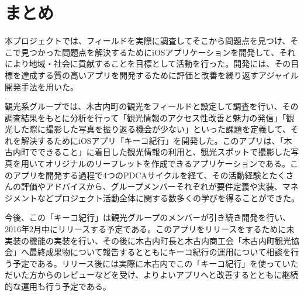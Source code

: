 \section{まとめ}
本プロジェクトでは、フィールドを実際に調査してそこから問題点を見つけ、そこで見つかった問題点を解決するためにiOSアプリケーションを開発して、それにより地域・社会に貢献することを目標として活動を行った。開発には、その目標を達成する質の高いアプリを開発するために評価と改善を繰り返すアジャイル開発手法を用いた。\\
\par 観光系グループでは、木古内町の観光をフィールドと設定して調査を行い、その調査結果をもとに分析を行って「観光情報のアクセス性改善と魅力の発信」「観光した際に撮影した写真を振り返る機会が少ない」といった課題を定義して、それを解決するためにiOSアプリ「キーコ紀行」を開発した。このアプリは、「木古内町でできること」に着目した観光情報の利用と、観光スポットで撮影した写真を用いてオリジナルのリーフレットを作成できるアプリケーションである。このアプリを開発する過程で4つのPDCAサイクルを経て、その活動経験とたくさんの評価やアドバイスから、グループメンバーそれぞれが要件定義や実装、マネジメントなどプロジェクト活動全体に関する数多くの学びを得ることができた。\\
\par 今後、この「キーコ紀行」は観光グループのメンバーが引き続き開発を行い、2016年2月中にリリースする予定である。このアプリをリリースをするために未実装の機能の実装を行い、その後に木古内町長と木古内商工会「木古内町観光協会」へ最終成果物について報告するとともにキーコ紀行の運用について相談を行う予定である。リリース後には実際に木古内でこの「キーコ紀行」を使っていただいた方からのレビューなどを受け、よりよいアプリへと改善するとともに継続的な運用も行う予定である。
